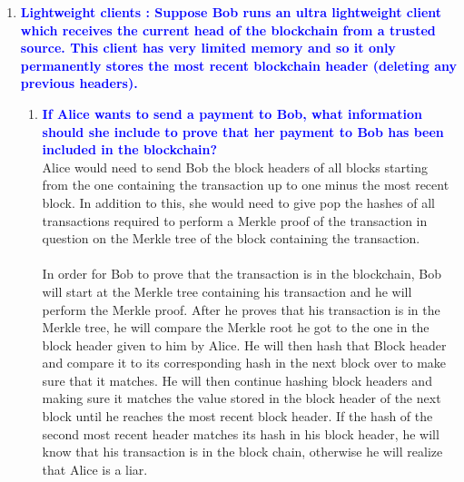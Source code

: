 \documentclass[11pt]{article}
\begin{document}
\begin{enumerate}
\item \textbf{\textcolor{blue}{Lightweight clients : Suppose Bob runs an ultra lightweight client which receives the current head of the blockchain from a trusted source. This client has very limited memory and so it only permanently stores the most recent blockchain header (deleting any previous headers).}}
    \begin{enumerate}
    \item \textbf{\textcolor{blue}{If Alice wants to send a payment to Bob, what information should she include to prove that her payment to Bob has been included in the blockchain?}}
        \\ Alice would need to send Bob the block headers of all blocks starting from the one containing the transaction up to one minus the most recent block. In addition to this, she would need to give pop the hashes of all transactions required to perform a Merkle proof of the transaction in question on the Merkle tree of the block containing the transaction.
        \\\\ In order for Bob to prove that the transaction is in the blockchain, Bob will start at the Merkle tree containing his transaction and he will perform the Merkle proof. After he proves that his transaction is in the Merkle tree, he will compare the Merkle root he got to the one in the block header given to him by Alice. He will then hash that Block header and compare it to its corresponding hash in the next block over to make sure that it matches. He will then continue hashing block headers and making sure it matches the value stored in the block header of the next block until he reaches the most recent block header. If the hash of the second most recent header matches its hash in his block header, he will know that his transaction is in the block chain, otherwise he will realize that Alice is a liar.
    

\end{enumerate}
\end{enumerate}
\end{document}
